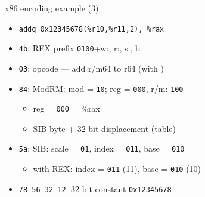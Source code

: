 \begin{frame}[fragile,label=x86ex3]{x86 encoding example (3)}
    \begin{itemize}
    \item \lstinline|addq 0x12345678(%r10,%r11,2), %rax|
    \item {\tt 4b}: REX prefix {\tt 0100}+w:{\tt {}}, r:{\tt \textcolor{violet!80!black}{}}, s:{\tt \textcolor{blue!80!black}{\myemph<4>{1}}}, b:{\tt \textcolor{green!80!black}{}}
    \item {\tt 03}: opcode --- add r/m64 to r64 (with )
    \item {\tt 84}: ModRM: mod = {\tt 10}; reg = {\tt 000}, r/m: {\tt 100}
        \begin{itemize}
        \item reg = {\tt \textcolor{violet!80!black}{}000} = \%rax
        \item SIB byte + 32-bit displacement (table)
        \end{itemize}
    \item {\tt 5a}: SIB: scale = {\tt 01}, index = {\tt 011}, base = {\tt 010}
        \begin{itemize}
        \item with REX: index = {\tt \textcolor{blue!80!black}{\myemph<4>{1}}011} (11), base = {\tt \textcolor{green!80!black}{}010} (10)
        \end{itemize}
    \item {\tt 78 56 32 12}: 32-bit constant {\tt 0x12345678}
    \end{itemize}
\end{frame}

